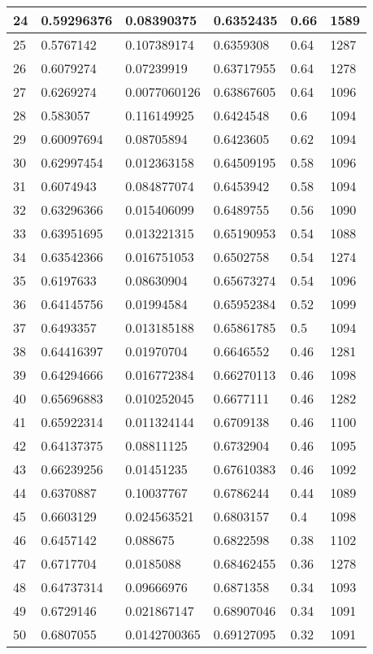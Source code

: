 \begin{longtable}{|l|l|l|l|l|l|}
24 & 0.59296376 & 0.08390375 & 0.6352435 & 0.66 & 1589 \\ \hline 
25 & 0.5767142 & 0.107389174 & 0.6359308 & 0.64 & 1287 \\ \hline 
26 & 0.6079274 & 0.07239919 & 0.63717955 & 0.64 & 1278 \\ \hline 
27 & 0.6269274 & 0.0077060126 & 0.63867605 & 0.64 & 1096 \\ \hline 
28 & 0.583057 & 0.116149925 & 0.6424548 & 0.6 & 1094 \\ \hline 
29 & 0.60097694 & 0.08705894 & 0.6423605 & 0.62 & 1094 \\ \hline 
30 & 0.62997454 & 0.012363158 & 0.64509195 & 0.58 & 1096 \\ \hline 
31 & 0.6074943 & 0.084877074 & 0.6453942 & 0.58 & 1094 \\ \hline 
32 & 0.63296366 & 0.015406099 & 0.6489755 & 0.56 & 1090 \\ \hline 
33 & 0.63951695 & 0.013221315 & 0.65190953 & 0.54 & 1088 \\ \hline 
34 & 0.63542366 & 0.016751053 & 0.6502758 & 0.54 & 1274 \\ \hline 
35 & 0.6197633 & 0.08630904 & 0.65673274 & 0.54 & 1096 \\ \hline 
36 & 0.64145756 & 0.01994584 & 0.65952384 & 0.52 & 1099 \\ \hline 
37 & 0.6493357 & 0.013185188 & 0.65861785 & 0.5 & 1094 \\ \hline 
38 & 0.64416397 & 0.01970704 & 0.6646552 & 0.46 & 1281 \\ \hline 
39 & 0.64294666 & 0.016772384 & 0.66270113 & 0.46 & 1098 \\ \hline 
40 & 0.65696883 & 0.010252045 & 0.6677111 & 0.46 & 1282 \\ \hline 
41 & 0.65922314 & 0.011324144 & 0.6709138 & 0.46 & 1100 \\ \hline 
42 & 0.64137375 & 0.08811125 & 0.6732904 & 0.46 & 1095 \\ \hline 
43 & 0.66239256 & 0.01451235 & 0.67610383 & 0.46 & 1092 \\ \hline 
44 & 0.6370887 & 0.10037767 & 0.6786244 & 0.44 & 1089 \\ \hline 
45 & 0.6603129 & 0.024563521 & 0.6803157 & 0.4 & 1098 \\ \hline 
46 & 0.6457142 & 0.088675 & 0.6822598 & 0.38 & 1102 \\ \hline 
47 & 0.6717704 & 0.0185088 & 0.68462455 & 0.36 & 1278 \\ \hline 
48 & 0.64737314 & 0.09666976 & 0.6871358 & 0.34 & 1093 \\ \hline 
49 & 0.6729146 & 0.021867147 & 0.68907046 & 0.34 & 1091 \\ \hline 
50 & 0.6807055 & 0.0142700365 & 0.69127095 & 0.32 & 1091 \\ \hline 
\end{longtable}